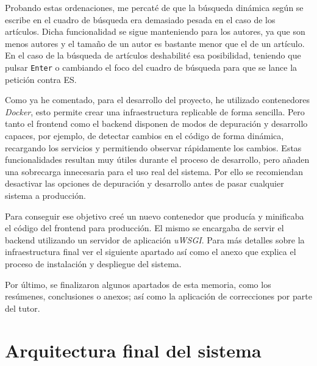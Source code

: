 Probando estas ordenaciones, me percaté de que la búsqueda dinámica según se escribe en el cuadro de búsqueda era demasiado pesada en el caso de los artículos. Dicha funcionalidad se sigue manteniendo para los autores, ya que son menos autores y el tamaño de un autor es bastante menor que el de un artículo. En el caso de la búsqueda de artículos deshabilité esa posibilidad, teniendo que pulsar \texttt{Enter} o cambiando el foco del cuadro de búsqueda para que se lance la petición contra \acrshort{ES}.

Como ya he comentado, para el desarrollo del proyecto, he utilizado contenedores \textit{Docker}, esto permite crear una infraestructura replicable de forma sencilla. Pero tanto el \gls{frontend} como el \gls{backend} disponen de modos de depuración y desarrollo capaces, por ejemplo, de detectar cambios en el código de forma dinámica, recargando los servicios y permitiendo observar rápidamente los cambios. Estas funcionalidades resultan muy útiles durante el proceso de desarrollo, pero añaden una sobrecarga innecesaria para el uso real del sistema. Por ello se recomiendan desactivar las opciones de depuración y desarrollo antes de pasar cualquier sistema a producción. 

Para conseguir ese objetivo creé un nuevo contenedor que producía y minificaba el código del \gls{frontend} para producción. El mismo se encargaba de servir el \gls{backend} utilizando un servidor de aplicación \textit{uWSGI}. Para más detalles sobre la infraestructura final ver el siguiente apartado así como el anexo que explica el proceso de instalación y despliegue del sistema.

Por último, se finalizaron algunos apartados de esta memoria, como los resúmenes, conclusiones o anexos; así como la aplicación de correcciones por parte del tutor.

\section{Arquitectura final del sistema}

